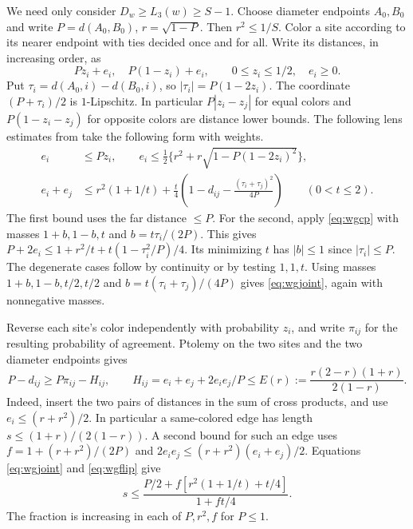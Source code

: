 \documentclass[11pt,a4paper]{article}
\theoremstyle{definition}
\begin{document}
We need only consider $D_w\ge L_3(w)\ge S-1$. Choose diameter
endpoints $A_0,B_0$ and write $P=d(A_0,B_0)$, $r=\sqrt{1-P}$.
Then $r^2\le1/S$. Color a site according to its nearer endpoint
with ties decided once and for all. Write its distances, in increasing
order, as
\[
 Pz_i+e_i,\quad P(1-z_i)+e_i,\qquad 0\le z_i\le1/2,\quad e_i\ge0 .
\]
Put $\tau_i=d(A_0,i)-d(B_0,i)$, so
$|\tau_i|=P(1-2z_i)$. The coordinate $(P+\tau_i)/2$ is
$1$-Lipschitz. In particular $P|z_i-z_j|$ for equal colors and
$P(1-z_i-z_j)$ for opposite colors are distance lower bounds.
The following lens estimates from \cite{Jiang} take the following form with
weights.
\begin{align}
 e_i&\le Pz_i,\qquad
 e_i\le\tfrac12\{r^2+r\sqrt{1-P(1-2z_i)^2}\},\label{eq:wglens}\\
 e_i+e_j&\le r^2(1+1/t)+\tfrac t4
 \left(1-d_{ij}-\frac{(\tau_i+\tau_j)^2}{4P}\right)
 \qquad(0<t\le2).\label{eq:wgjoint}
\end{align}
The first bound uses the far distance $\le P$. For the second, apply
\eqref{eq:wgcp} with masses $1+b,1-b,t$ and $b=t\tau_i/(2P)$.
This gives $P+2e_i\le1+r^2/t+t(1-\tau_i^2/P)/4$.
Its minimizing $t$ has $|b|\le1$ since $|\tau_i|\le P$. The
degenerate cases follow by continuity or by testing $1,1,t$.
Using masses $1+b,1-b,t/2,t/2$ and $b=t(\tau_i+\tau_j)/(4P)$
gives \eqref{eq:wgjoint}, again with nonnegative masses.

Reverse each site's color independently with probability $z_i$,
and write $\pi_{ij}$ for the resulting probability of agreement.
Ptolemy on the two sites and the two diameter endpoints gives
\begin{equation}
 P-d_{ij}\ge P\pi_{ij}-H_{ij},\qquad
 H_{ij}=e_i+e_j+2e_ie_j/P\le E(r):=\frac{r(2-r)(1+r)}{2(1-r)} .
 \label{eq:wgflip}
\end{equation}
Indeed, insert the two pairs of distances in the sum of cross
products, and use $e_i\le(r+r^2)/2$. In particular a same-colored
edge has length $s\le(1+r)/(2(1-r))$. A second bound for such an edge
uses $f=1+(r+r^2)/(2P)$ and $2e_ie_j\le (r+r^2)(e_i+e_j)/2$.
Equations \eqref{eq:wgjoint} and \eqref{eq:wgflip} give
\begin{equation}
 s\le\frac{P/2+f[r^2(1+1/t)+t/4]}{1+ft/4}.
 \label{eq:wgseamcount}
\end{equation}
The fraction is increasing in each of $P,r^2,f$ for $P\le1$.
\end{document}
